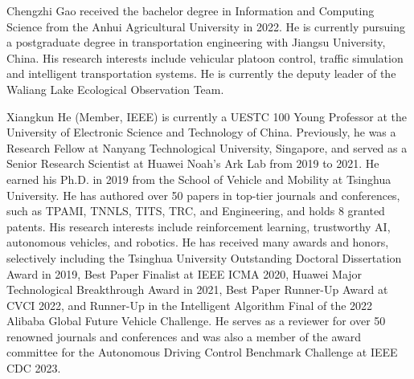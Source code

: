     \begin{IEEEbiography}{Chengzhi Gao}
    received the bachelor degree in Information and Computing Science from the Anhui Agricultural University in 2022. He is currently pursuing a postgraduate degree in transportation engineering with Jiangsu University, China. His research interests include vehicular platoon control, traffic simulation and intelligent transportation systems. He is currently the deputy leader of the Waliang Lake Ecological Observation Team.
    \end{IEEEbiography}
    \begin{IEEEbiography}{Xiangkun He}
        (Member, IEEE) is currently a UESTC 100 Young Professor at the University of Electronic Science and Technology of China. Previously, he was a Research Fellow at Nanyang Technological University, Singapore, and served as a Senior Research Scientist at Huawei Noah's Ark Lab from 2019 to 2021. He earned his Ph.D. in 2019 from the School of Vehicle and Mobility at Tsinghua University. He has authored over 50 papers in top-tier journals and conferences, such as TPAMI, TNNLS, TITS, TRC, and Engineering, and holds 8 granted patents. His research interests include reinforcement learning, trustworthy AI, autonomous vehicles, and robotics. He has received many awards and honors, selectively including the Tsinghua University Outstanding Doctoral Dissertation Award in 2019, Best Paper Finalist at IEEE ICMA 2020, Huawei Major Technological Breakthrough Award in 2021, Best Paper Runner-Up Award at CVCI 2022, and Runner-Up in the Intelligent Algorithm Final of the 2022 Alibaba Global Future Vehicle Challenge. He serves as a reviewer for over 50 renowned journals and conferences and was also a member of the award committee for the Autonomous Driving Control Benchmark Challenge at IEEE CDC 2023.
    \end{IEEEbiography} 
